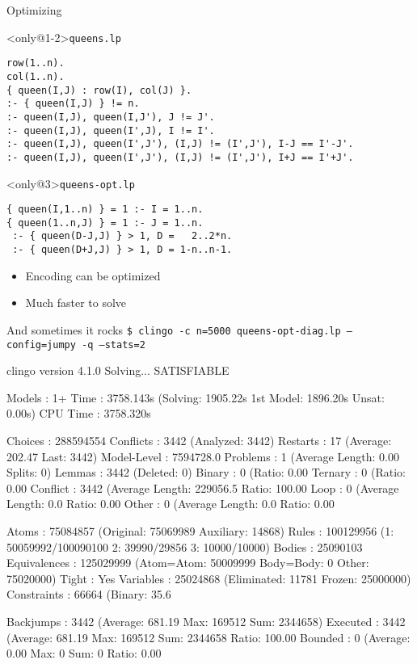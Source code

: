 \begin{frame}[fragile]{Optimizing}
  \bigskip
  \begin{block}<only@1-2>{\texttt{queens.lp}}
\begin{lstlisting}[basicstyle=\footnotesize\ttfamily]
row(1..n).
col(1..n).
{ queen(I,J) : row(I), col(J) }.
:- { queen(I,J) } != n.
:- queen(I,J), queen(I,J'), J != J'.
:- queen(I,J), queen(I',J), I != I'.
:- queen(I,J), queen(I',J'), (I,J) != (I',J'), I-J == I'-J'.
:- queen(I,J), queen(I',J'), (I,J) != (I',J'), I+J == I'+J'.
\end{lstlisting}
  \end{block}
  \begin{block}<only@3>{\texttt{queens-opt.lp}}
\begin{lstlisting}
{ queen(I,1..n) } = 1 :- I = 1..n.
{ queen(1..n,J) } = 1 :- J = 1..n.
 :- { queen(D-J,J) } > 1, D =   2..2*n.
 :- { queen(D+J,J) } > 1, D = 1-n..n-1.
\end{lstlisting}
  \end{block}
  \vfill
  \begin{itemize}
  \item<2-3> Encoding can be optimized
  \item<2-3> Much faster to solve
  \end{itemize}
  \bigskip
\end{frame}
\begin{frame}[fragile,shrink=1]{And sometimes it rocks}
  \mbox{\Large\texttt{\$ clingo -c n=5000 queens-opt-diag.lp --config=jumpy -q --stats=2}}
  \pause
\begin{semiverbatim}
clingo version 4.1.0
Solving...
SATISFIABLE

Models       : 1+
Time         : 3758.143s (Solving: 1905.22s 1st Model: 1896.20s Unsat: 0.00s)
CPU Time     : 3758.320s

Choices      : 288594554
Conflicts    : 3442   (Analyzed: 3442)
Restarts     : 17     (Average: 202.47 Last: 3442)
Model-Level  : 7594728.0
Problems     : 1      (Average Length: 0.00 Splits: 0)
Lemmas       : 3442   (Deleted: 0)
  Binary     : 0      (Ratio:   0.00%
  Ternary    : 0      (Ratio:   0.00%
  Conflict   : 3442   (Average Length: 229056.5 Ratio: 100.00%
  Loop       : 0      (Average Length:    0.0 Ratio:   0.00%
  Other      : 0      (Average Length:    0.0 Ratio:   0.00%

Atoms        : 75084857 (Original: 75069989 Auxiliary: 14868)
Rules        : 100129956 (1: 50059992/100090100 2: 39990/29856 3: 10000/10000)
Bodies       : 25090103
Equivalences : 125029999 (Atom=Atom: 50009999 Body=Body: 0 Other: 75020000)
Tight        : Yes
Variables    : 25024868 (Eliminated: 11781 Frozen: 25000000)
Constraints  : 66664  (Binary: 35.6%

Backjumps    : 3442   (Average: 681.19 Max: 169512 Sum: 2344658)
  Executed   : 3442   (Average: 681.19 Max: 169512 Sum: 2344658 Ratio: 100.00%
  Bounded    : 0      (Average:  0.00 Max:   0 Sum:      0 Ratio:   0.00%
\end{semiverbatim}
\end{frame}
%
